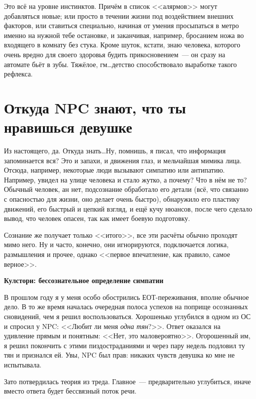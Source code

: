 \documentclass[a4paper,14pt,oneside]{memoir}
\begin{document}
Это всё на уровне инстинктов. Причём в список <<алярмов>> могут добавляться новые; или просто в течении жизни под воздействием внешних факторов, или ставиться специально, начиная от умения просыпаться в метро именно на нужной тебе остановке, и заканчивая, например, бросанием ножа во входящего в комнату без стука. Кроме шуток, кстати, знаю человека, которого очень вредно для своего здоровья будить прикосновением~--- он сразу на автомате бьёт в зубы. Тяжёлое, гм\ldots детство способствовало выработке такого рефлекса. 


\section{Откуда NPC знают, что ты нравишься девушке}

\medskip
Из настоящего, да. Откуда знать\ldots Ну, помнишь, я писал, что информация запоминается вся? Это и запахи, и движения глаз, и мельчайшая мимика лица. Отсюда, например, некоторые люди вызывают симпатию или антипатию. Например, увидел на улице человека и стало жутко, а почему? Что в нём не то? Обычный человек, ан нет, подсознание обработало его детали (всё, что связанно с опасностью для жизни, оно делает очень быстро), обнаружило его пластику движений, его быстрый и цепкий взгляд, и ещё кучу нюансов, после чего сделало вывод, что человек опасен, так как имеет боевую подготовку.

Сознание же получает только <<итого>>, все эти расчёты обычно проходят мимо него. Ну и часто, конечно, они игнорируются, подключается логика, размышления и прочее, однако <<первое впечатление, как правило, самое верное>>.

\begin{shaded}

\begin{center}
\Large\bfseries{Кулстори: бессознательное определение симпатии}
\end{center}

В прошлом году я у меня особо обострились ЕОТ-переживания, вполне обычное дело. В то же время началась очередная полоса успехов на поприще осознанных сновидений, чем я решил воспользоваться. Хорошенько углубился в одном из ОС и спросил у NPC: <<Любит ли меня \textit{одна тян}?>>. Ответ оказался на удивление прямым и понятным: <<Нет, это маловероятно>>. Огорошенный им, я решил покончить с этими пиздостраданиями и через пару недель подловил ту тян и признался ей. Увы, NPC был прав: никаких чувств девушка ко мне не испытывала. 

Зато потвердилась теория из треда. Главное~--- предварительно углубиться, иначе вместо ответа будет бессвязный поток речи.

\end{shaded}
\end{document}
